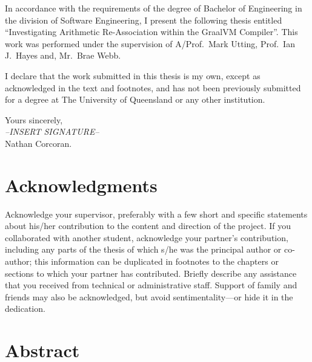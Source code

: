 \documentclass[12pt,openany,a4paper]{book}
\begin{document}
In accordance with the requirements of the degree of Bachelor of
Engineering in the division of 
Software Engineering,
I present the
following thesis entitled ``Investigating Arithmetic Re-Association within the GraalVM Compiler''.  This work was performed under the supervision of
A/Prof.\ Mark Utting, Prof.\ Ian J.\ Hayes and, Mr.\ Brae Webb.

I declare that the work submitted in this thesis is my own, except as
acknowledged in the text and footnotes, and has not been previously
submitted for a degree at The University of Queensland or any other
institution.

\begin{flushright}
	Yours sincerely,\\
	\medskip
	\emph{--INSERT SIGNATURE--}\\
	\medskip
	Nathan Corcoran.
\end{flushright}

\cleardoublepage

\chapter{Acknowledgments}

Acknowledge your supervisor, preferably with a few short and specific
statements about his/her contribution to the content and direction of
the project.  If you collaborated with another student, acknowledge
your partner's contribution, including any parts of the thesis of
which s/he was the principal author or co-author; this information can
be duplicated in footnotes to the chapters or sections to which your
partner has contributed.  Briefly describe any assistance that you
received from technical or administrative staff.  Support of family
and friends may also be acknowledged, but avoid sentimentality---or
hide it in the dedication.

\cleardoublepage

\chapter{Abstract}

\tableofcontents

\listoffigures
{}

\listoftables
{}

% 
\end{document}
